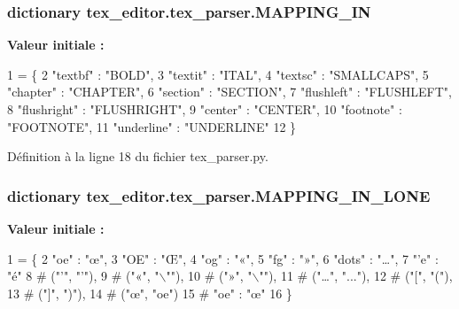 \subsubsection[{M\+A\+P\+P\+I\+N\+G\+\_\+\+I\+N}]{\setlength{\rightskip}{0pt plus 5cm}dictionary tex\+\_\+editor.\+tex\+\_\+parser.\+M\+A\+P\+P\+I\+N\+G\+\_\+\+I\+N}\label{namespacetex__editor_1_1tex__parser_a0b8e21ec116f7e53f3d4858c996694e8}
{\bfseries Valeur initiale \+:}
\begin{DoxyCode}
1 = \{
2 \textcolor{stringliteral}{"textbf"} : \textcolor{stringliteral}{"BOLD"},
3 \textcolor{stringliteral}{"textit"} : \textcolor{stringliteral}{"ITAL"},
4 \textcolor{stringliteral}{"textsc"} : \textcolor{stringliteral}{"SMALLCAPS"},
5 \textcolor{stringliteral}{"chapter"} : \textcolor{stringliteral}{"CHAPTER"},
6 \textcolor{stringliteral}{"section"} : \textcolor{stringliteral}{"SECTION"},
7 \textcolor{stringliteral}{"flushleft"} : \textcolor{stringliteral}{"FLUSHLEFT"},
8 \textcolor{stringliteral}{"flushright"} : \textcolor{stringliteral}{"FLUSHRIGHT"},
9 \textcolor{stringliteral}{"center"} : \textcolor{stringliteral}{"CENTER"},
10 \textcolor{stringliteral}{"footnote"} : \textcolor{stringliteral}{"FOOTNOTE"},
11 \textcolor{stringliteral}{"underline"} : \textcolor{stringliteral}{"UNDERLINE"}
12 \}
\end{DoxyCode}


Définition à la ligne 18 du fichier tex\+\_\+parser.\+py.

\hypertarget{namespacetex__editor_1_1tex__parser_a14298f87033d99150129b74f82d484de}{}
\subsubsection[{M\+A\+P\+P\+I\+N\+G\+\_\+\+I\+N\+\_\+\+L\+O\+N\+E}]{\setlength{\rightskip}{0pt plus 5cm}dictionary tex\+\_\+editor.\+tex\+\_\+parser.\+M\+A\+P\+P\+I\+N\+G\+\_\+\+I\+N\+\_\+\+L\+O\+N\+E}\label{namespacetex__editor_1_1tex__parser_a14298f87033d99150129b74f82d484de}
{\bfseries Valeur initiale \+:}
\begin{DoxyCode}
1 = \{
2 \textcolor{stringliteral}{"oe"} : \textcolor{stringliteral}{"œ"},
3 \textcolor{stringliteral}{"OE"} : \textcolor{stringliteral}{"Œ"},
4 \textcolor{stringliteral}{"og"} : \textcolor{stringliteral}{"«"},
5 \textcolor{stringliteral}{"fg"} : \textcolor{stringliteral}{"»"},
6 \textcolor{stringliteral}{"dots"} : \textcolor{stringliteral}{"…"},
7 \textcolor{stringliteral}{"'e"} : \textcolor{stringliteral}{"é"}
8 \textcolor{comment}{# ("’", "'"),}
9 \textcolor{comment}{# ("«", "\(\backslash\)""),}
10 \textcolor{comment}{# ("»", "\(\backslash\)""),}
11 \textcolor{comment}{# ("…", "..."),}
12 \textcolor{comment}{# ("[", "("),}
13 \textcolor{comment}{# ("]", ")"),}
14 \textcolor{comment}{# ("œ", "oe")}
15 \textcolor{comment}{# "oe" : "œ"}
16 \}
\end{DoxyCode}


